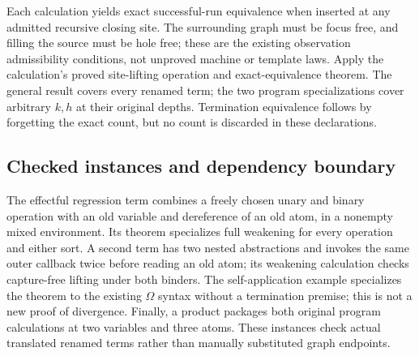 



Each calculation yields exact successful-run equivalence when inserted at
any admitted recursive closing site. The surrounding graph must be focus
free, and filling the source must be hole free; these are the existing
observation admissibility conditions, not unproved machine or template laws.
Apply the calculation's proved site-lifting operation and exact-equivalence
theorem. The general result covers every renamed term; the two program
specializations cover arbitrary $k,h$ at their original depths. Termination
equivalence follows by forgetting the exact count, but no count is discarded
in these declarations.




\subsection{Checked instances and dependency boundary}

The effectful regression term combines a freely chosen unary and binary
operation with an old variable and dereference of an old atom, in a nonempty
mixed environment. Its theorem specializes full weakening for every operation
and either sort. A second term has two nested abstractions and invokes the
same outer callback twice before reading an old atom; its weakening calculation
checks capture-free lifting under both binders. The self-application example
specializes the theorem to the existing $\Omega$ syntax without a termination
premise; this is not a new proof of divergence. Finally, a product packages
both original program calculations at two variables and three atoms. These
instances check actual translated renamed terms rather than manually
substituted graph endpoints.

